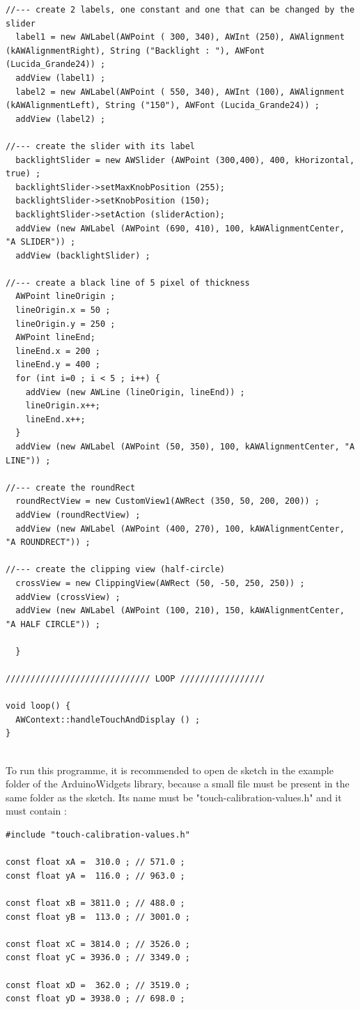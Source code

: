 \documentclass[a4paper,11pt]{extarticle}
\begin{document}
\begin{lstlisting}[language=Arduino]
//--- create 2 labels, one constant and one that can be changed by the slider 
  label1 = new AWLabel(AWPoint ( 300, 340), AWInt (250), AWAlignment (kAWAlignmentRight), String ("Backlight : "), AWFont (Lucida_Grande24)) ;
  addView (label1) ;
  label2 = new AWLabel(AWPoint ( 550, 340), AWInt (100), AWAlignment (kAWAlignmentLeft), String ("150"), AWFont (Lucida_Grande24)) ;
  addView (label2) ;

//--- create the slider with its label
  backlightSlider = new AWSlider (AWPoint (300,400), 400, kHorizontal, true) ;
  backlightSlider->setMaxKnobPosition (255);
  backlightSlider->setKnobPosition (150);
  backlightSlider->setAction (sliderAction);
  addView (new AWLabel (AWPoint (690, 410), 100, kAWAlignmentCenter, "A SLIDER")) ;
  addView (backlightSlider) ;

//--- create a black line of 5 pixel of thickness
  AWPoint lineOrigin ;
  lineOrigin.x = 50 ;
  lineOrigin.y = 250 ;
  AWPoint lineEnd;
  lineEnd.x = 200 ;
  lineEnd.y = 400 ;
  for (int i=0 ; i < 5 ; i++) {
    addView (new AWLine (lineOrigin, lineEnd)) ;
    lineOrigin.x++;
    lineEnd.x++;
  }
  addView (new AWLabel (AWPoint (50, 350), 100, kAWAlignmentCenter, "A LINE")) ;

//--- create the roundRect
  roundRectView = new CustomView1(AWRect (350, 50, 200, 200)) ;
  addView (roundRectView) ;   
  addView (new AWLabel (AWPoint (400, 270), 100, kAWAlignmentCenter, "A ROUNDRECT")) ;

//--- create the clipping view (half-circle)
  crossView = new ClippingView(AWRect (50, -50, 250, 250)) ;
  addView (crossView) ;
  addView (new AWLabel (AWPoint (100, 210), 150, kAWAlignmentCenter, "A HALF CIRCLE")) ;
  
  }

///////////////////////////// LOOP /////////////////

void loop() {
  AWContext::handleTouchAndDisplay () ;
}
\end{lstlisting}

~\\ To run this programme, it is recommended to open de sketch in the example folder of the ArduinoWidgets library, because a small file must be present in the same folder as the sketch. Its name must be "touch-calibration-values.h" and it must contain :

\begin{lstlisting}[language=Arduinonl]
#include "touch-calibration-values.h"

const float xA =  310.0 ; // 571.0 ;
const float yA =  116.0 ; // 963.0 ;

const float xB = 3811.0 ; // 488.0 ;
const float yB =  113.0 ; // 3001.0 ;

const float xC = 3814.0 ; // 3526.0 ;
const float yC = 3936.0 ; // 3349.0 ;

const float xD =  362.0 ; // 3519.0 ;
const float yD = 3938.0 ; // 698.0 ;
\end{lstlisting}
\end{document}
